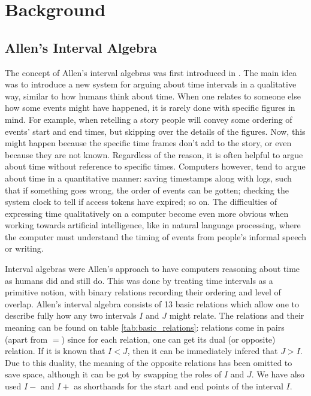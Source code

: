 \section{Background}%
\label{sec:background}

\subsection{Allen's Interval Algebra}%
\label{sub:allen_interval_algebras}

The concept of Allen's interval algebras was first introduced in \cite{allen83}. The main
idea was to introduce a new system for arguing about time intervals in a qualitative way, similar
to how humans think about time. When one relates to someone else how some events might have
happened, it is rarely done with specific figures in mind. For example, when retelling a story
people will convey some ordering of events' start and end times, but skipping over the details
of the figures. Now, this might happen because the specific time frames don't add to the
story, or even because they are not known. Regardless of the reason, it is often helpful to argue
about time without reference to specific times. Computers however, tend to argue about time in a
quantitative manner: saving timestamps along with logs, such that if something goes wrong, the
order of events can be gotten; checking the system clock to tell if access tokens have expired;
so on. The difficulties of expressing time qualitatively on a computer become even more obvious
when working towards artificial intelligence, like in natural language processing, where the
computer must understand the timing of events from people's informal speech or writing.

Interval algebras were Allen's approach to have computers reasoning about time as humans did and
still do. This was done by treating time intervals as a primitive notion, with binary relations
recording their ordering and level of overlap. Allen's interval algebra consists of 13 basic
relations which allow one to describe fully how any two intervals $I$ and $J$ might relate. The
relations and their meaning can be found on table \ref{tab:basic_relations}: relations come in
pairs (apart from $=$) since for each relation, one can get its dual (or opposite) relation.
If it is known that \(I < J\), then it can be immediately infered that \(J > I\). Due to this
duality, the meaning of the opposite relations has been omitted to save space, although it can be
got by swapping the roles of $I$ and $J$. We have also used $I-$ and $I+$ as shorthands for the
start and end points of the interval $I$.

